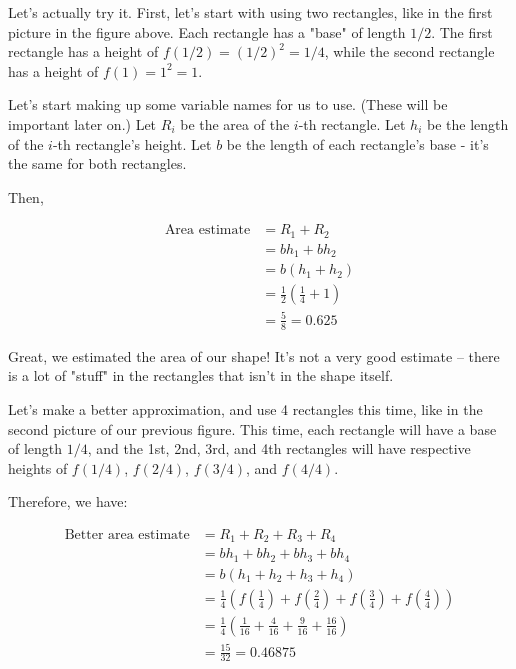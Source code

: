 \documentclass{book}
\begin{document}

Let's actually try it. First, let's start with using two rectangles, like in the first picture in the figure above. Each rectangle has a "base" of length $1/2$. The first rectangle has a height of $f(1/2) = (1/2)^2 = 1/4$, while the second rectangle has a height of $f(1) = 1^2 = 1$. 

Let's start making up some variable names for us to use. (These will be important later on.) Let $R_{i}$ be the area of the $i$-th rectangle. Let $h_{i}$ be the length of the $i$-th rectangle's height. Let $b$ be the length of each rectangle's base - it's the same for both rectangles.

Then,  

\begin{align*}
\text{Area estimate} &= R_1 + R_2 \\
&= b h_1 + b h_2 \\
&= b (h_1 + h_2) \\
&= \frac{1}{2} \left( \frac{1}{4} + 1 \right) \\
&= \frac{5}{8} = 0.625
\end{align*}

Great, we estimated the area of our shape! It's not a very good estimate -- there is a lot of "stuff" in the rectangles that isn't in the shape itself.

Let's make a better approximation, and use 4 rectangles this time, like in the second picture of our previous figure. This time, each rectangle will have a base of length $1/4$, and the 1st, 2nd, 3rd, and 4th rectangles will have respective heights of $f(1/4)$, $f(2/4)$, $f(3/4)$, and $f(4/4)$. 


Therefore, we have:  

\begin{align*}
\text{Better area estimate} &= R_1 + R_2 + R_3 + R_4 \\
&= b h_1 + b h_2 + b h_3 + b h_4 \\
&= b (h_1 + h_2 + h_3 + h_4) \\
&= \frac{1}{4} \left( f(\frac{1}{4}) + f(\frac{2}{4}) + f(\frac{3}{4}) + f(\frac{4}{4}) \right) \\
&= \frac{1}{4} \left( \frac{1}{16} + \frac{4}{16} + \frac{9}{16} + \frac{16}{16} \right) \\
&= \frac{15}{32} = 0.46875
\end{align*}
\end{document}
